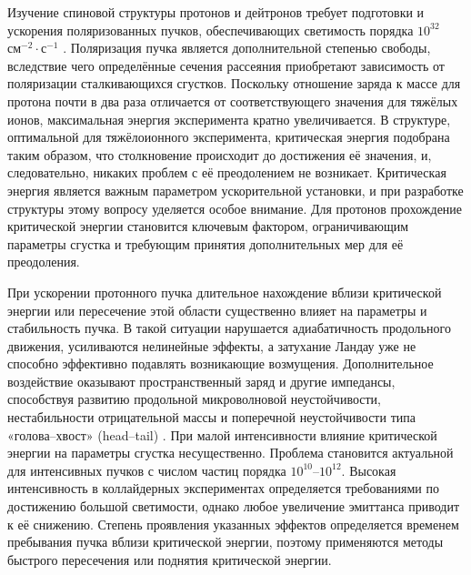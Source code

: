 \par	Изучение спиновой структуры протонов и дейтронов требует подготовки и ускорения поляризованных пучков, обеспечивающих светимость порядка $10^{32}$~$\text{см}^{-2}\cdot\text{с}^{-1}$ \autocite{RHIC_luminosity}. Поляризация пучка является дополнительной степенью свободы, вследствие чего определённые сечения рассеяния приобретают зависимость от поляризации сталкивающихся сгустков. Поскольку отношение заряда к массе для протона почти в два раза отличается от соответствующего значения для тяжёлых ионов, максимальная энергия эксперимента кратно увеличивается. В структуре, оптимальной для тяжёлоионного эксперимента, критическая энергия подобрана таким образом, что столкновение происходит до достижения её значения, и, следовательно, никаких проблем с её преодолением не возникает. Критическая энергия является важным параметром ускорительной установки, и при разработке структуры этому вопросу уделяется особое внимание. Для протонов прохождение критической энергии становится ключевым фактором, ограничивающим параметры сгустка и требующим принятия дополнительных мер для её преодоления.

\par	При ускорении протонного пучка длительное нахождение вблизи критической энергии или пересечение этой области существенно влияет на параметры и стабильность пучка. В такой ситуации нарушается адиабатичность продольного движения, усиливаются нелинейные эффекты, а затухание Ландау уже не способно эффективно подавлять возникающие возмущения. Дополнительное воздействие оказывают пространственный заряд и другие импедансы, способствуя развитию продольной микроволновой неустойчивости, нестабильности отрицательной массы и поперечной неустойчивости типа «голова–хвост» (head–tail) \autocite{ng, lee}. При малой интенсивности влияние критической энергии на параметры сгустка несущественно. Проблема становится актуальной для интенсивных пучков с числом частиц порядка $10^{10}$–$10^{12}$. Высокая интенсивность в коллайдерных экспериментах определяется требованиями по достижению большой светимости, однако любое увеличение эмиттанса приводит к её снижению. Степень проявления указанных эффектов определяется временем пребывания пучка вблизи критической энергии, поэтому применяются методы быстрого пересечения или поднятия критической энергии.

